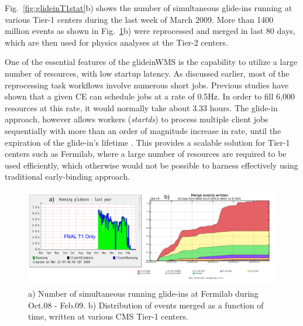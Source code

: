 \documentclass[a4paper]{jpconf}
\begin{document}
Fig.~\ref{fig:glideinT1stat}b) shows the number of simultaneous glide-ins running at various Tier-1 centers during the last week of March 2009. 
More than 1400 million events as shown in Fig.~\ref{fig:merged_events}b) were reprocessed and merged in last 80 days, which are then 
used for physics analyses at the Tier-2 centers. 

One of the essential features of the glideinWMS is the capability to utilize a large number of
resources, with low startup latency. As discussed earlier, most of the reprocessing task 
workflows involve numerous short jobs. Previous studies have shown that a given CE can 
schedule jobs at a rate of 0.5Hz. In order to fill 6,000 resources at this rate, it would normally take 
about 3.33 hours.  The glide-in approach, however allows workers (\emph{startds}) 
to process multiple client jobs sequentially with more than an order of magnitude increase in rate, until 
the expiration of the glide-in's lifetime \cite{bib:ce_rate}. This provides a scalable solution for Tier-1 centers such as Fermilab, 
where a large number of resources are required to be used efficiently, which otherwise would not 
be possible to harness effectively using traditional early-binding approach.
\begin{figure}
\begin{center}
\includegraphics[scale=0.55]{merged_events}
\end{center}
\caption{a) Number of simultaneous running glide-ins at Fermilab during Oct.08 - Feb.09. b) Distribution of 
events merged as a function of time, written at various CMS Tier-1 centers.}
\label{fig:merged_events}
\end{figure}
\end{document}
